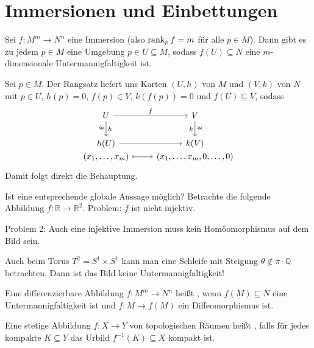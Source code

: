 \section*{Immersionen und Einbettungen}

\begin{satz}[label=satz:immersion_bild]
	Sei $f \colon M^m \to N^n$ eine Immersion (also $\operatorname{rank}_p f =m$ für alle $p \in M$).
	Dann gibt es zu jedem $p \in M$ eine Umgebung $p \in U \subseteq M$, sodass $f(U) \subseteq N$ eine $m$-dimensionale Untermannigfaltigkeit ist.
\end{satz}
\begin{beweis}
	Sei $p \in M$.
	Der Rangsatz liefert uns Karten $(U,h)$ von $M$ und $(V,k)$ von $N$ mit $p \in U$, $h(p)=0$, $f(p) \in V$, $k(f(p))=0$ und $f(U) \subseteq V$, sodass
	\[
		\begin{tikzcd}
			U \rar["f"] \dar["h","\cong"'] & V \dar["\cong","k"'] \\
			h(U) \rar & k(V) \\[-2em]
			(x_1, \ldots ,x_m) \rar[mapsto] & (x_1, \ldots ,x_m, 0, \ldots ,0)
		\end{tikzcd}
	\]
	Damit folgt direkt die Behauptung.
\end{beweis}

Ist eine entsprechende globale Aussage möglich? Betrachte die folgende Abbildung $f \colon \mathbb{R} \to \mathbb{R}^2$.
Problem: $f$ ist nicht injektiv.

Problem 2: Auch eine injektive Immersion muss kein Homöomorphismus auf dem Bild sein.

Auch beim Torus $T^2= S^1 \times S^1$ kann man eine Schleife mit Steigung $\theta \notin \pi \cdot \mathbb{Q}$ betrachten.
Dann ist das Bild keine Untermannigfaltigkeit!

\begin{definition}[{name=[Einbettung]}]
	Eine differenzierbare Abbildung $f \colon M^m \to N^n$ heißt , wenn $f(M) \subseteq N$ eine Untermannigfaltigkeit ist und $f \colon M \to f(M)$ ein Diffeomorphismus ist.
\end{definition}

\begin{definition}[{name=[eigentliche Abbildung]}]
	Eine stetige Abbildung $f\colon X \to Y$ von topologischen Räumen heißt , falls für jedes kompakte $K \subseteq Y$ das Urbild $f^{-1}(K) \subseteq X$ kompakt ist.
\end{definition}

